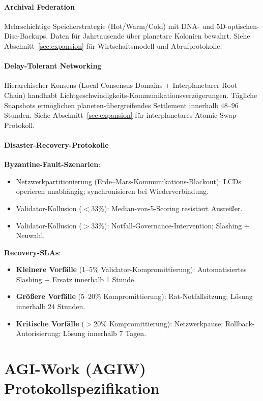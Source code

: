 \documentclass[11pt]{article}
\begin{document}
\paragraph{Archival Federation}
Mehrschichtige Speicherstrategie (Hot/Warm/Cold) mit DNA- und 5D-optischen-Disc-Backups. Daten für Jahrtausende über planetare Kolonien bewahrt. Siehe Abschnitt~\ref{sec:expansion} für Wirtschaftsmodell und Abrufprotokolle.

\paragraph{Delay-Tolerant Networking}
Hierarchischer Konsens (Local Consensus Domains + Interplanetarer Root Chain) handhabt Lichtgeschwindigkeits-Kommunikationsverzögerungen. Tägliche Snapshots ermöglichen planeten-übergreifendes Settlement innerhalb 48--96 Stunden. Siehe Abschnitt~\ref{sec:expansion} für interplanetares Atomic-Swap-Protokoll.

\paragraph{Disaster-Recovery-Protokolle}
\textbf{Byzantine-Fault-Szenarien}:
\begin{itemize}[noitemsep]
  \item Netzwerkpartitionierung (Erde--Mars-Kommunikations-Blackout): LCDs operieren unabhängig; synchronisieren bei Wiederverbindung.
  \item Validator-Kollusion ($<$33\%): Median-von-5-Scoring resistiert Ausreißer.
  \item Validator-Kollusion ($>$33\%): Notfall-Governance-Intervention; Slashing + Neuwahl.
\end{itemize}

\textbf{Recovery-SLAs}:
\begin{itemize}[noitemsep]
  \item \textbf{Kleinere Vorfälle} (1--5\% Validator-Kompromittierung): Automatisiertes Slashing + Ersatz innerhalb 1 Stunde.
  \item \textbf{Größere Vorfälle} (5--20\% Kompromittierung): Rat-Notfallsitzung; Lösung innerhalb 24 Stunden.
  \item \textbf{Kritische Vorfälle} ($>$20\% Kompromittierung): Netzwerkpause; Rollback-Autorisierung; Lösung innerhalb 7 Tagen.
\end{itemize}

\section{AGI-Work (AGIW) Protokollspezifikation}
\label{sec:agiw-spec}
\end{document}
